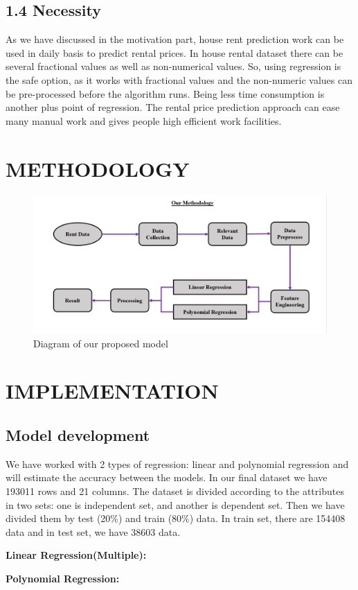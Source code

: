 \documentclass[conference]{IEEEtran}[10]
\begin{document}
\subsection*{1.4 Necessity}
As we have discussed in the motivation part, house rent prediction work can be used in daily basis to predict rental prices. In house rental dataset there can be several fractional values as well as non-numerical values. So, using regression is the safe option, as it works with fractional values and the non-numeric values can be pre-processed before the algorithm runs. Being less time consumption is another plus point of regression. The rental price prediction approach can ease many  manual work and gives people high efficient work facilities. 

\section{METHODOLOGY}
\begin{figure}[H]
\centering
\includegraphics[scale=0.2]{methodology}
\caption{ Diagram of our proposed model}
\end{figure}
\section{IMPLEMENTATION}
\subsection{Model development}
We have worked with 2 types of regression: linear and polynomial regression and will estimate the accuracy between the models. In our final dataset we have 193011 rows and 21 columns. The dataset is divided according to the attributes in two sets: one is independent set, and another is dependent set. Then we have divided them by test (20\%) and train (80\%) data. In train set, there are 154408 data and in test set, we have 38603 data.

\textbf{Linear Regression(Multiple):}

\textbf{Polynomial Regression:}
\end{document}

